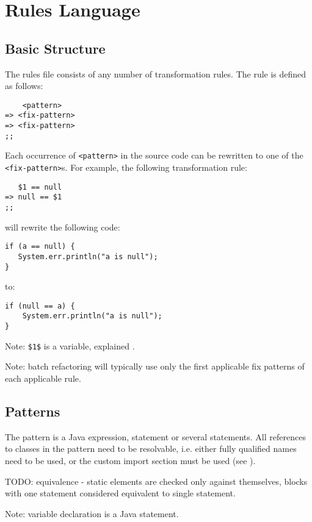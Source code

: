 \documentclass{article}
\begin{document}
\section{Rules Language}

\subsection{Basic Structure}

The rules file consists of any number of transformation rules.
The rule is defined as follows:
\begin{verbatim}
    <pattern>
=> <fix-pattern>
=> <fix-pattern>
;;
\end{verbatim}

Each occurrence of \verb=<pattern>= in the source code can be rewritten to one
of the \verb=<fix-pattern>=s. For example, the following transformation rule:
\begin{verbatim}
   $1 == null
=> null == $1
;;
\end{verbatim}

will rewrite the following code:
\begin{verbatim}
if (a == null) {
   System.err.println("a is null");
}
\end{verbatim}
to:
\begin{verbatim}
if (null == a) {
    System.err.println("a is null");
}
\end{verbatim}

Note: \verb=$1$= is a variable, explained \hyperref{below}{in Section~}{variables}{}.

Note: batch refactoring will typically use only the first applicable fix patterns
of each applicable rule.

\subsection{Patterns}

The pattern is a Java expression, statement or several statements.
All references to classes in the pattern need to be resolvable, i.e. either fully
qualified names need to be used, or the custom import section must be used
(see \hyperref{Custom Imports}{Section~}{custom-import}{}).

TODO: equivalence - static elements are checked only against themselves, blocks with
one statement considered equivalent to single statement.

Note: variable declaration is a Java statement.
\end{document}
